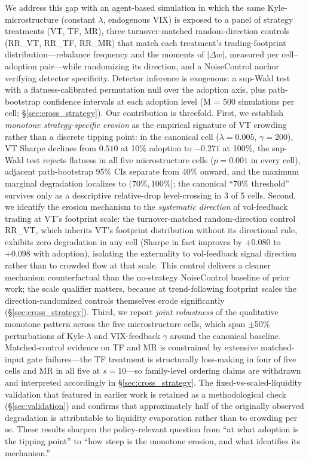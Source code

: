 \documentclass[12pt,a4paper]{article}
\begin{document}
We address this gap with an agent-based simulation in which the same Kyle-microstructure (constant $\lambda$, endogenous VIX) is exposed to a panel of strategy treatments (VT, TF, MR), three turnover-matched random-direction controls (RR\_VT, RR\_TF, RR\_MR) that match each treatment's trading-footprint distribution---rebalance frequency and the moments of $|\Delta w|$, measured per cell--adoption pair---while randomizing its direction, and a NoiseControl anchor verifying detector specificity. Detector inference is exogenous: a sup-Wald test with a flatness-calibrated permutation null over the adoption axis, plus path-bootstrap confidence intervals at each adoption level (M = 500 simulations per cell; \S\ref{sec:cross_strategy}). Our contribution is threefold. First, we establish \emph{monotone strategy-specific erosion} as the empirical signature of VT crowding rather than a discrete tipping point: in the canonical cell ($\lambda = 0.005$, $\gamma = 200$), VT Sharpe declines from $0.510$ at 10\% adoption to $-0.271$ at 100\%, the sup-Wald test rejects flatness in all five microstructure cells ($p = 0.001$ in every cell), adjacent path-bootstrap 95\% CIs separate from 40\% onward, and the maximum marginal degradation localizes to $(70\%, 100\%]$; the canonical ``70\% threshold'' survives only as a descriptive relative-drop level-crossing in 3 of 5 cells. Second, we identify the erosion mechanism to the \emph{systematic direction} of vol-feedback trading at VT's footprint scale: the turnover-matched random-direction control RR\_VT, which inherits VT's footprint distribution without its directional rule, exhibits zero degradation in any cell (Sharpe in fact improves by $+0.080$ to $+0.098$ with adoption), isolating the externality to vol-feedback signal direction rather than to crowded flow at that scale. This control delivers a cleaner mechanism counterfactual than the no-strategy NoiseControl baseline of prior work; the scale qualifier matters, because at trend-following footprint scales the direction-randomized controls themselves erode significantly (\S\ref{sec:cross_strategy}). Third, we report \emph{joint robustness} of the qualitative monotone pattern across the five microstructure cells, which span $\pm$50\% perturbations of Kyle-$\lambda$ and VIX-feedback $\gamma$ around the canonical baseline. Matched-control evidence on TF and MR is constrained by extensive matched-input gate failures---the TF treatment is structurally loss-making in four of five cells and MR in all five at $s=10$---so family-level ordering claims are withdrawn and interpreted accordingly in \S\ref{sec:cross_strategy}. The fixed-vs-scaled-liquidity validation that featured in earlier work is retained as a methodological check (\S\ref{sec:validation}) and confirms that approximately half of the originally observed degradation is attributable to liquidity evaporation rather than to crowding per se. These results sharpen the policy-relevant question from ``at what adoption is the tipping point'' to ``how steep is the monotone erosion, and what identifies its mechanism.''
\end{document}
